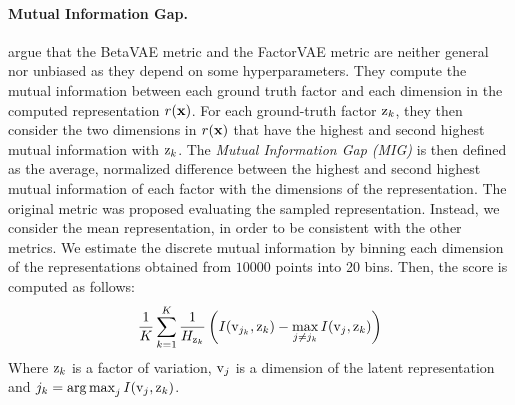 \paragraph{Mutual Information Gap.} 
\citet{chen2018isolating} argue that the BetaVAE metric and the FactorVAE metric are neither general nor unbiased as they depend on some hyperparameters. 
They compute the mutual information between each ground truth factor and each dimension in the computed representation $r({\mathbf{x}})$.
For each ground-truth factor ${\textnormal{z}}_k$, they then consider the two dimensions in $r({\mathbf{x}})$ that have the highest and second highest mutual information with ${\textnormal{z}}_k$.
The \emph{Mutual Information Gap (MIG)} is then defined as the average, normalized difference between the highest and second highest mutual information of each factor with the dimensions of the representation.
The original metric was proposed evaluating the sampled representation. 
Instead, we consider the mean representation, in order to be consistent with the other metrics. 
We estimate the discrete mutual information by binning each dimension of the representations obtained from $\num{10000}$ points into 20 bins. 
Then, the score is computed as follows:
\begin{align*}
\frac{1}{K}\sum_{k=1}^K \frac{1}{H_{{\textnormal{z}}_k}}\left(I({\textnormal{v}}_{j_k}, {\textnormal{z}}_k) - \max_{j\neq j_k} I({\textnormal{v}}_j, {\textnormal{z}}_k)\right)
\end{align*}
Where ${\textnormal{z}}_k$ is a factor of variation, ${\textnormal{v}}_j$ is a dimension of the latent representation and $j_k = \operatorname*{arg\,max}_j I({\textnormal{v}}_j,{\textnormal{z}}_k)$.

